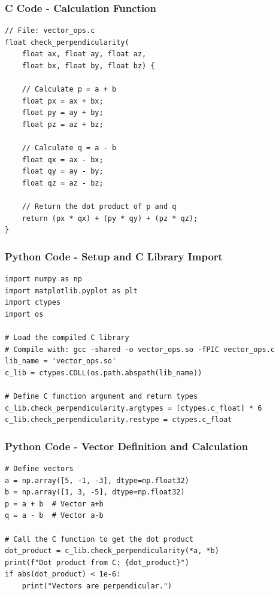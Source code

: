 \documentclass{beamer}
\begin{document}

\begin{frame}[fragile]
    \frametitle{C Code - Calculation Function}
    \lstset{language=C}
    \begin{lstlisting}
// File: vector_ops.c
float check_perpendicularity(
    float ax, float ay, float az, 
    float bx, float by, float bz) {
    
    // Calculate p = a + b
    float px = ax + bx;
    float py = ay + by;
    float pz = az + bz;

    // Calculate q = a - b
    float qx = ax - bx;
    float qy = ay - by;
    float qz = az - bz;

    // Return the dot product of p and q
    return (px * qx) + (py * qy) + (pz * qz);
}
    \end{lstlisting}
\end{frame}

\begin{frame}[fragile]
    \frametitle{Python Code - Setup and C Library Import}
    \lstset{language=Python}
    \begin{lstlisting}
import numpy as np
import matplotlib.pyplot as plt
import ctypes
import os

# Load the compiled C library
# Compile with: gcc -shared -o vector_ops.so -fPIC vector_ops.c
lib_name = 'vector_ops.so'
c_lib = ctypes.CDLL(os.path.abspath(lib_name))

# Define C function argument and return types
c_lib.check_perpendicularity.argtypes = [ctypes.c_float] * 6
c_lib.check_perpendicularity.restype = ctypes.c_float
    \end{lstlisting}
\end{frame}

\begin{frame}[fragile]
    \frametitle{Python Code - Vector Definition and Calculation}
    \lstset{language=Python}
    \begin{lstlisting}
# Define vectors
a = np.array([5, -1, -3], dtype=np.float32)
b = np.array([1, 3, -5], dtype=np.float32)
p = a + b  # Vector a+b
q = a - b  # Vector a-b

# Call the C function to get the dot product
dot_product = c_lib.check_perpendicularity(*a, *b)
print(f"Dot product from C: {dot_product}")
if abs(dot_product) < 1e-6:
    print("Vectors are perpendicular.")
    \end{lstlisting}
\end{frame}
\end{document}
